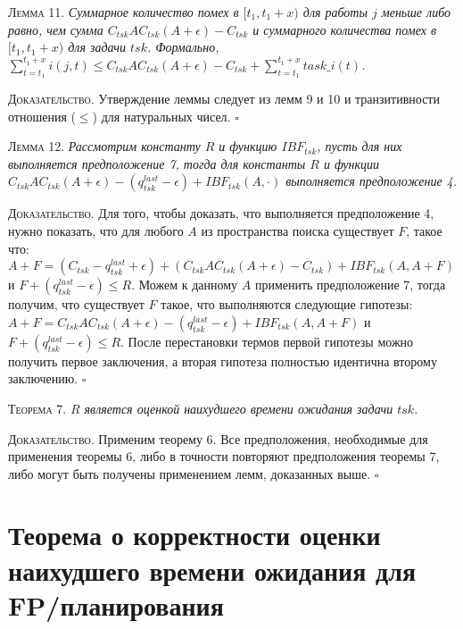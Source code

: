 \textsc{Лемма 11.}
\textit{Суммарное количество помех в $[t_1, t_1 + x)$ для работы $j$ меньше либо равно,
 чем сумма $C_{tsk}AC_{tsk}(A + \epsilon) - C_{tsk}$ и
   суммарного количества помех в $[t_1, t_1 + x)$ для задачи $tsk$.
 Формально,
   $\sum_{t = t_1}^{t_1 + x} i(j,t)
     \leq C_{tsk}AC_{tsk}(A + \epsilon) - C_{tsk} +  \sum_{t = t_1}^{t_1 + x} task\_i(t)$. }

\textsc{Доказательство.} Утверждение леммы следует из лемм 9 и 10 и транзитивности отношения ($\leq$) для натуральных чисел. $\square$

\textsc{Лемма 12.}
\textit{Рассмотрим константу $R$ и функцию $IBF_{tsk}$, пусть для них выполняется предположение 7,
  тогда для константы $R$ и функции $C_{tsk}AC_{tsk} (A + \epsilon) - (q_{tsk}^{last} - \epsilon) + IBF_{tsk}(A, \cdot)$
  выполняется предположение 4. }

\textsc{Доказательство.} Для того, чтобы доказать, что выполняется предположение 4, нужно показать,
  что для любого $A$ из пространства поиска существует $F$, такое что:
    $A + F =  (C_{tsk} - q_{tsk}^{last} +\epsilon) +  (C_{tsk}AC_{tsk}(A + \epsilon) - C_{tsk}) + IBF_{tsk}(A, A + F)$
    и $F + (q_{tsk}^{last} - \epsilon) \leq R$.
  Можем к данному $A$ применить предположение 7, тогда получим, что существует $F$ такое,
    что выполняются следующие гипотезы:
    $A + F = C_{tsk}AC_{tsk}(A + \epsilon) - (q_{tsk}^{last}- \epsilon) + IBF_{tsk}(A, A + F)$
    и $F + (q_{tsk}^{last}- \epsilon) \leq R$.
  После перестановки термов первой гипотезы можно получить первое заключения,
  а вторая гипотеза полностью идентична второму заключению. $\square$

\textsc{Теорема 7.}
\textit{$R$ является оценкой наихудшего времени ожидания задачи $tsk$. }

\textsc{Доказательство.} Применим теорему 6. Все предположения, необходимые для
  применения теоремы 6, либо в точности повторяют предположения теоремы 7,
  либо могут быть получены применением лемм, доказанных выше. $\square$



\section{Теорема о корректности оценки наихудшего времени ожидания для FP\-/планирования}

